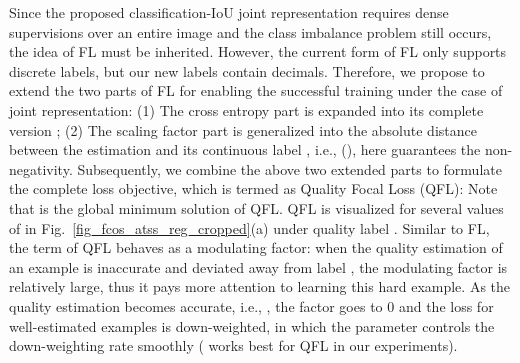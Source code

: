 \documentclass{article}
\begin{document}
Since the proposed classification-IoU joint representation requires dense supervisions over an entire image and the class imbalance problem still occurs, the idea of FL must be inherited. However, the current form of FL only supports  discrete labels, but our new labels contain decimals. Therefore, we propose to extend the two parts of FL for enabling the successful training under the case of joint representation: (1) The cross entropy part  is expanded into its complete version ; (2) The scaling factor part  is generalized into the absolute distance between the estimation  and its continuous label , i.e.,  (), here  guarantees the non-negativity. 
Subsequently, we combine the above two extended parts to formulate the complete loss objective, which is termed as Quality Focal Loss (QFL):
Note that  is the global minimum solution of QFL. QFL is visualized for several values of  in Fig.~\ref{fig_fcos_atss_reg_cropped}(a) under quality label . Similar to FL, the term  of QFL behaves as a modulating factor: when the quality estimation of an example is inaccurate and deviated away from label , the modulating factor is relatively large, thus it pays more attention to learning this hard example. As the quality estimation becomes accurate, i.e., , the factor goes to 0 and the loss for well-estimated examples is down-weighted, in which the parameter  controls the down-weighting rate smoothly ( works best for QFL in our experiments). 
\end{document}
